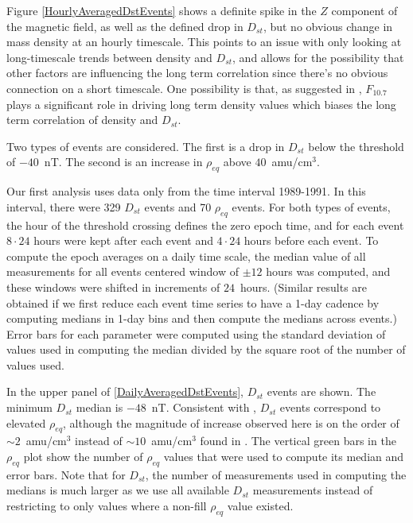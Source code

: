 \documentclass[10pt,twocolumn]{article}
\begin{document}
Figure \ref{HourlyAveragedDstEvents} shows a definite spike in the $Z$ component of the magnetic field, as well as the defined drop in $D_{st}$, but no obvious change in mass density at an hourly timescale. This points to an issue with only looking at long-timescale trends between density and $D_{st}$, and allows for the possibility that other factors are influencing the long term correlation since there's no obvious connection on a short timescale. One possibility is that, as suggested in \cite{Takahashi2010}, $F_{10.7}$ plays a significant role in driving long term density values which biases the long term correlation of density and $D_{st}$.

Two types of events are considered. The first is a drop in $D_{st}$ below the threshold of $-40$~nT.  The second is an increase in $\rho_{eq}$ above $40$~amu/cm$^3$.

Our first analysis uses data only from the time interval 1989-1991.  In this interval, there were 329 $D_{st}$ events and 70 $\rho_{eq}$ events.  For both types of events, the hour of the threshold crossing defines the zero epoch time, and for each event $8\cdot24$ hours were kept after each event and $4\cdot24$ hours before each event.  To compute the epoch averages on a daily time scale, the median value of all measurements for all events centered window of $\pm 12$ hours was computed, and these windows were shifted in increments of $24$~hours. (Similar results are obtained if we first reduce each event time series to have a 1-day cadence by computing medians in 1-day bins and then compute the medians across events.)  Error bars for each parameter were computed using the standard deviation of values used in computing the median divided by the square root of the number of values used.

In the upper panel of \ref{DailyAveragedDstEvents}, $D_{st}$ events are shown.  The minimum $D_{st}$ median is $-48$~nT.  Consistent with \cite{Takahashi2010}, $D_{st}$ events correspond to elevated $\rho_{eq}$, although the magnitude of increase observed here is on the order of $\sim2$~amu/cm$^3$ instead of $\sim10$~amu/cm$^3$ found in \cite{Takahashi2010}.  The vertical green bars in the $\rho_{eq}$ plot show the number of $\rho_{eq}$ values that were used to compute its median and error bars.  Note that for $D_{st}$, the number of measurements used in computing the medians is much larger as we use all available $D_{st}$ measurements instead of restricting to only values where a non-fill $\rho_{eq}$ value existed.  
\end{document}
